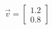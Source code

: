 \documentclass[preview]{standalone}
\begin{document}
\begin{align*}
\vec{v}=\begin{bmatrix}1.2\\0.8\end{bmatrix}
\end{align*}
\end{document}
